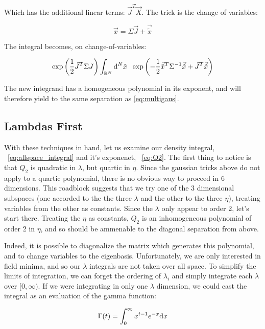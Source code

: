 \documentclass[10pt,letterpaper]{article}
\def\d{{\rm d}}  %
\begin{document}
Which has the additional linear terms: $\vec{J}^T \vec{X}$. The trick is the change of variables:

$$\vec{x} = \Sigma \vec{J} + \vec{\tilde{x}}$$

The integral becomes, on change-of-variables:

\begin{equation} \label{eq:multigaus_lintrick}
\exp\left(\frac{1}{2}\vec{J}^T \Sigma J\right) \int_{\mathbb{R}^N} \d^N \tilde{x} \hspace{0.5pc} \exp\left(-\frac{1}{2} \vec{\tilde{x}}^T \Sigma^{-1} \vec{\tilde{x}} + \vec{J}^T \vec{\tilde{x}}\right)
\end{equation}

The new integrand has a homogeneous polynomial in its exponent, and will therefore yield to the same separation as \ref{eq:multigaus}.

\subsection{Lambdas First} \label{lambdasec}

With these techniques in hand, let us examine our density integral, ~\ref{eq:allspace_integral} and it's exponenet, ~\ref{eq:Q2}. The first thing to notice is that $Q_2$ is quadratic in $\lambda$, but quartic in $\eta$. Since the gaussian tricks above do not apply to a quartic polynomial, there is no obvious way to proceed in 6 dimensions. This roadblock suggests that we try one of the 3 dimensional subspaces (one accorded to the the three $\lambda$ and the other to the three $\eta$), treating variables from the other as constants. Since the $\lambda$ only appear to order 2, let's start there. Treating the $\eta$ as constants, $Q_2$ is an inhomogeneous polynomial of order 2 in $\eta$, and so should be ammenable to the diagonal separation from above.
\par Indeed, it is possible to diagonalize the matrix which generates this polynomial, and to change variables to the eigenbasis. Unfortunately, we are only interested in field minima, and so our $\lambda$ integrals are not taken over all space. To simplify the limits of integration, we can forget the ordering of $\lambda_i$ and simply integrate each $\lambda$ over $[0,\infty)$. If we were integrating in only one $\lambda$ dimension, we could cast the integral as an evaluation of the gamma function:

\begin{equation} \label{eq:gamma}
\Gamma(t) = \int_{0}^{\infty} x^{t-1} e^{-x} \d x
\end{equation}
\end{document}

